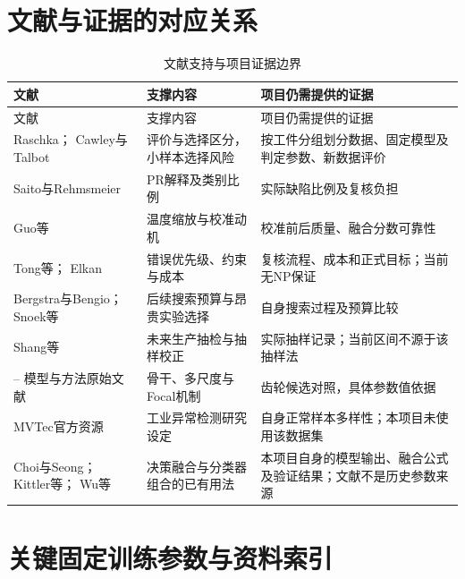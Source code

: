 \FloatBarrier{}\section{文献与证据的对应关系}

\begingroup\small{}
\begin{longtable}{@{}>{\raggedright\arraybackslash}p{0.240\dimexpr\linewidth-4\tabcolsep\relax}>{\raggedright\arraybackslash}p{0.340\dimexpr\linewidth-4\tabcolsep\relax}>{\raggedright\arraybackslash}p{0.420\dimexpr\linewidth-4\tabcolsep\relax}@{}}
\caption{文献支持与项目证据边界}\\
\toprule
文献 & 支撑内容 & 项目仍需提供的证据 \\
\midrule\endfirsthead
\toprule
文献 & 支撑内容 & 项目仍需提供的证据 \\
\midrule\endhead
\midrule\multicolumn{3}{r}{\footnotesize 续下页}\endfoot
\bottomrule\endlastfoot
\cite{ref1} Raschka；\cite{ref2} Cawley与Talbot & 评价与选择区分，小样本选择风险 & 按工件分组划分数据、固定模型及判定参数、新数据评价 \\
\cite{ref3} Saito与Rehmsmeier & PR解释及类别比例 & 实际缺陷比例及复核负担 \\
\cite{ref4} Guo等 & 温度缩放与校准动机 & 校准前后质量、融合分数可靠性 \\
\cite{ref5} Tong等；\cite{ref6} Elkan & 错误优先级、约束与成本 & 复核流程、成本和正式目标；当前无NP保证 \\
\cite{ref7} Bergstra与Bengio；\cite{ref8} Snoek等 & 后续搜索预算与昂贵实验选择 & 自身搜索过程及预算比较 \\
\cite{ref9} Shang等 & 未来生产抽检与抽样校正 & 实际抽样记录；当前区间不源于该抽样法 \\
\cite{ref10}--\cite{ref13} 模型与方法原始文献 & 骨干、多尺度与Focal机制 & 齿轮候选对照，具体参数值依据 \\
\cite{ref14} MVTec官方资源 & 工业异常检测研究设定 & 自身正常样本多样性；本项目未使用该数据集 \\
\cite{ref15} Choi与Seong；\cite{ref16} Kittler等；\cite{ref17} Wu等 & 决策融合与分类器组合的已有用法 & 本项目自身的模型输出、融合公式及验证结果；文献不是历史参数来源 \\
\end{longtable}\endgroup


\FloatBarrier{}\section{关键固定训练参数与资料索引}

